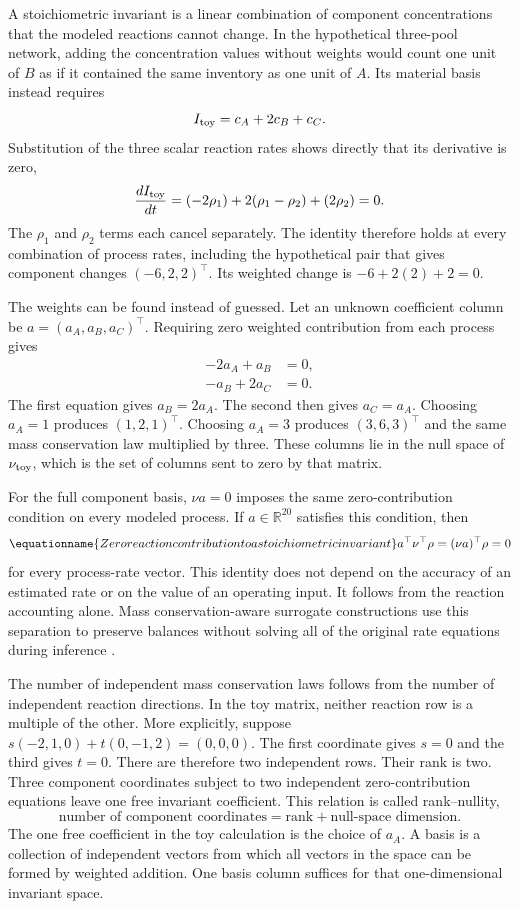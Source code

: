 A stoichiometric invariant is a linear combination of component concentrations that the modeled reactions cannot change. In the hypothetical three-pool network, adding the concentration values without weights would count one unit of $B$ as if it contained the same inventory as one unit of $A$. Its material basis instead requires
\[
I_{\rm toy}=c_A+2c_B+c_C.
\]
Substitution of the three scalar reaction rates shows directly that its derivative is zero,
\[
\frac{d I_{\rm toy}}{dt}
=(-2\rho_1)+2(\rho_1-\rho_2)+(2\rho_2)=0.
\]
The $\rho_1$ and $\rho_2$ terms each cancel separately. The identity therefore holds at every combination of process rates, including the hypothetical pair that gives component changes $(-6,2,2)^\top$. Its weighted change is $-6+2(2)+2=0$.

The weights can be found instead of guessed. Let an unknown coefficient column be $a=(a_A,a_B,a_C)^\top$. Requiring zero weighted contribution from each process gives
\[
\begin{aligned}
-2a_A+a_B&=0,\\
-a_B+2a_C&=0.
\end{aligned}
\]
The first equation gives $a_B=2a_A$. The second then gives $a_C=a_A$. Choosing $a_A=1$ produces $(1,2,1)^\top$. Choosing $a_A=3$ produces $(3,6,3)^\top$ and the same mass conservation law multiplied by three. These columns lie in the null space of $\nu_{\rm toy}$, which is the set of columns sent to zero by that matrix.

For the full component basis, $\nu a=0$ imposes the same zero-contribution condition on every modeled process. If $a\in\mathbb{R}^{20}$ satisfies this condition, then
\begin{equation}
\equationname{Zero reaction contribution to a stoichiometric invariant}
a^\top\nu^\top\rho=(\nu a)^\top\rho=0
\label{eq:individual_invariant}
\end{equation}
for every process-rate vector. This identity does not depend on the accuracy of an estimated rate or on the value of an operating input. It follows from the reaction accounting alone. Mass conservation-aware surrogate constructions use this separation to preserve balances without solving all of the original rate equations during inference \citep{SturmWexler2020,SturmWexler2022,Hansen2024}.

The number of independent mass conservation laws follows from the number of independent reaction directions. In the toy matrix, neither reaction row is a multiple of the other. More explicitly, suppose $s(-2,1,0)+t(0,-1,2)=(0,0,0)$. The first coordinate gives $s=0$ and the third gives $t=0$. There are therefore two independent rows. Their rank is two. Three component coordinates subject to two independent zero-contribution equations leave one free invariant coefficient. This relation is called rank--nullity,
\[
\text{number of component coordinates}
=\text{rank}+\text{null-space dimension}.
\]
The one free coefficient in the toy calculation is the choice of $a_A$. A basis is a collection of independent vectors from which all vectors in the space can be formed by weighted addition. One basis column suffices for that one-dimensional invariant space.

